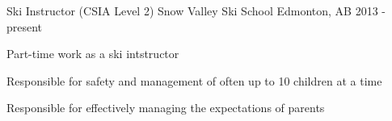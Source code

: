 \begin{cventries}
  \cventry
    {Ski Instructor (CSIA Level 2)} %
    {Snow Valley Ski School} %
    {Edmonton, AB} %
    {2013 - present} %
    {
      \begin{cvitems} %
      \item {Part-time work as a ski intstructor}
      \item {Responsible for safety and management of often up to 10 children at a time}
      \item {Responsible for effectively managing the expectations of parents}
      \end{cvitems}
    }
\end{cventries}
